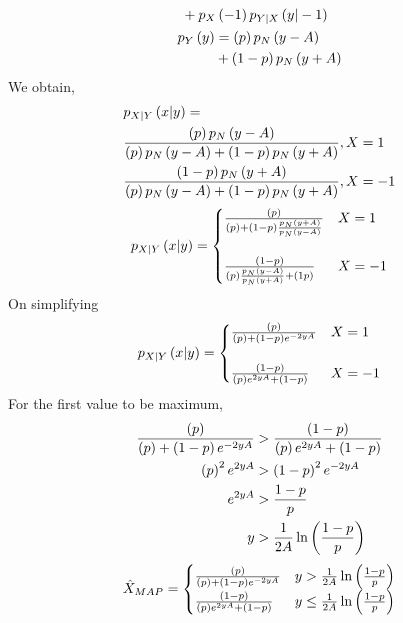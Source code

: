 \documentclass[journal,12pt,twocolumn]{IEEEtran}
\renewcommand\thesection{\arabic{section}}
\begin{document}
\begin{enumerate}[label=\thesection.\arabic*
,ref=\thesection.\theenumi]
\begin{align}
\begin{split}
		&+  p_X\left(-1\right) p_{Y|X}\left(y|-1\right) 
	\end{split} \\
	\begin{split}
		p_Y\left(y\right) &= \left(p\right) p_N\left(y-A\right) \\
		&+ \left(1-p\right) p_N\left(y+A\right)
	\end{split}	
\end{align}
We obtain,
\begin{align}
\begin{split}
	 &p_{X|Y}\left(x|y\right) = \\
	  &\frac{\left(p\right) p_N\left(y-A\right) } {\left(p\right) p_N\left(y-A\right) + \left(1-p\right)p_N\left(y+A\right) } , X = 1\\
	 &\frac{\left(1-p\right) p_N\left(y+A\right) } {\left(p\right) p_N\left(y-A\right) + \left(1-p\right)p_N\left(y+A\right) } , X = -1
\end{split} 
\end{align} 
\begin{align}
	 p_{X|Y}\left(x|y\right) = 
	 \begin{cases}
	  \frac{\left(p\right)} {\left(p\right) + \left(1-p\right) \frac{p_N\left(y+A\right)}{p_N\left(y-A\right)}} & X = 1\\ \\
	 \frac{\left(1-p\right)} { \left(p\right) \frac{p_N\left(y-A\right)}{p_N\left(y+A\right)} + \left(1 p\right)} & X = -1
	 \end{cases}
\end{align} 
On simplifying
\begin{align}
	  p_{X|Y}\left(x|y\right) = 
	 \begin{cases}
	 \frac{\left(p\right)} {\left(p\right) + \left(1-p\right) e^{-2yA} } & X = 1\\ \\
	 \frac{\left(1-p\right) } { \left(p\right) e^{2yA} + \left(1-p\right) } & X = -1
	 \end{cases}
\end{align}
For the first value to be maximum,
\begin{align}
	\frac{\left(p\right)} {\left(p\right) + \left(1-p\right) e^{-2yA} } 
	&> \frac{\left(1-p\right) } { \left(p\right) e^{2yA} + \left(1-p\right) } \\
	\left(p\right)^2 e^{2yA} &> \left(1-p\right)^2 e^{-2yA} \\
	e^{2yA} &> \frac{1-p}{p} \\
	y &> \frac{1}{2A} \ln{\ensuremath{\left( \frac{1-p}{p} \right)}}
\end{align}
\begin{align}
\begin{split}
	 \hat{X}_{MAP} = 
	 \begin{cases}
	 \frac{\left(p\right)} {\left(p\right) + \left(1-p\right) e^{-2yA} } & y > \frac{1}{2A} \ln{\ensuremath{\left( \frac{1-p}{p} \right)}}\\
	 \frac{\left(1-p\right) } { \left(p\right) e^{2yA} + \left(1-p\right) } & y \le \frac{1}{2A} \ln{\ensuremath{\left( \frac{1-p}{p} \right)}}
	 \end{cases}
\end{split}
\end{align}
\end{enumerate}
%		
\end{document}
